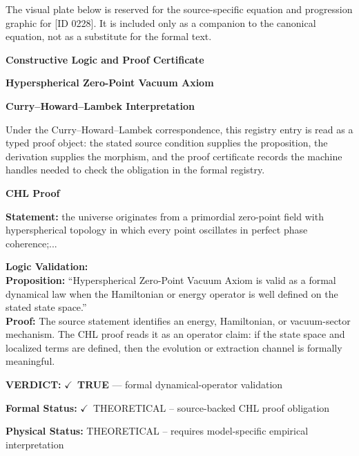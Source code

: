 \begingroup\footnotesize\sloppy
The visual plate below is reserved for the source-specific equation and progression graphic for [ID 0228]. It is included only as a companion to the canonical equation, not as a substitute for the formal text.
\par\endgroup
\ifTZPDarkEdition
{}
\fi

\clearpage
\begingroup\tzpsupportsetup
\noindent\textbf{\fontsize{10.8pt}{12.8pt}\selectfont [ID 0228] Constructive Logic and Proof Certificate}\par
\noindent\textbf{\fontsize{10pt}{12pt}\selectfont Hyperspherical Zero-Point Vacuum Axiom}\par
\vspace{0.45em}
\begingroup
\footnotesize
\setlength{\parskip}{0.22em}
\setlength{\parindent}{0pt}
\noindent\textbf{Curry--Howard--Lambek Interpretation}\par
Under the Curry--Howard--Lambek correspondence, this registry entry is read as a typed proof
object: the stated source condition supplies the proposition, the derivation supplies the
morphism, and the proof certificate records the machine handles needed to check the obligation
in the formal registry.

\vspace{0.45em}
\noindent\textbf{CHL Proof}\par
\textbf{Statement:} the universe originates from a primordial zero-point field with hyperspherical topology
in which every point oscillates in perfect phase coherence;...

\textbf{Logic Validation:}\\
\textbf{Proposition:} ``Hyperspherical Zero-Point Vacuum Axiom is valid as a formal dynamical law when the
Hamiltonian or energy operator is well defined on the stated state space.''\\
\textbf{Proof:} The source statement identifies an energy, Hamiltonian, or vacuum-sector mechanism. The
CHL proof reads it as an operator claim: if the state space and localized terms are
defined, then the evolution or extraction channel is formally meaningful.

\textbf{VERDICT:} \ensuremath{\checkmark}\ \textbf{TRUE} --- formal dynamical-operator validation

\textbf{Formal Status:} \ensuremath{\checkmark}\ THEORETICAL -- source-backed CHL proof obligation

\textbf{Physical Status:} THEORETICAL -- requires model-specific empirical interpretation
\par\vspace{0.45em}
\par
\ifTZPDarkEdition
{}
\fi
\endgroup
\endgroup
